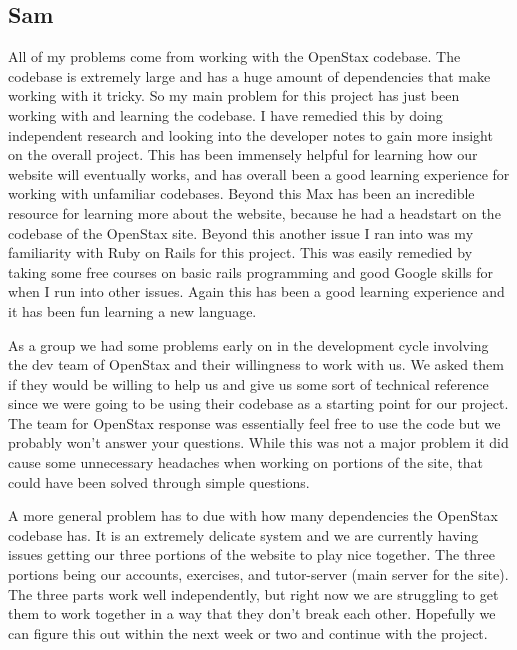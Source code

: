 \documentclass[onecolumn, draftclsnofoot,10pt, compsoc]{IEEEtran}
\begin{document}
\subsection{Sam}
All of my problems come from working with the OpenStax codebase. The codebase is extremely large and has a huge amount of dependencies that make working with it tricky. So my main problem for this project has just been working with and learning the codebase. I have remedied this by doing independent research and looking into the developer notes to gain more insight on the overall project. This has been immensely helpful for learning how our website will eventually works, and has overall been a good learning experience for working with unfamiliar codebases. Beyond this Max has been an incredible resource for learning more about the website, because he had a headstart on the codebase of the OpenStax site. Beyond this another issue I ran into was my familiarity with Ruby on Rails for this project. This was easily remedied by taking some free courses on basic rails programming and good Google skills for when I run into other issues. Again this has been a good learning experience and it has been fun learning a new language. 

As a group we had some problems early on in the development cycle involving the dev team of OpenStax and their willingness to work with us. We asked them if they would be willing to help us and give us some sort of technical reference since we were going to be using their codebase as a starting point for our project. The team for OpenStax response was essentially feel free to use the code but we probably won’t answer your questions. While this was not a major problem it did cause some unnecessary headaches when working on portions of the site, that could have been solved through simple questions.

 A more general problem has to due with how many dependencies the OpenStax codebase has. It is an extremely delicate system and we are currently having issues getting our three portions of the website to play nice together. The three portions being our accounts, exercises, and tutor-server (main server for the site). The three parts work well independently, but right now we are struggling to get them to work together in a way that they don’t break each other. Hopefully we can figure this out within the next week or two and continue with the project. 
 
\end{document}
